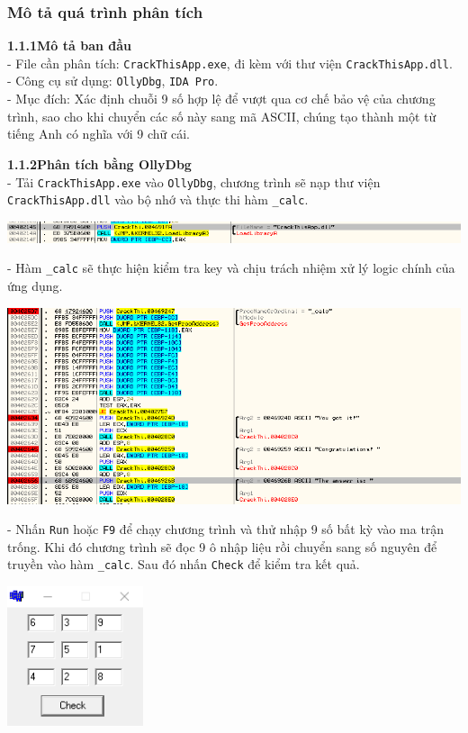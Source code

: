 
\subsubsection{Mô tả quá trình phân tích}
\noindent\textbf{1.1.1\quad Mô tả ban đầu}\\
- File cần phân tích: \texttt{CrackThisApp.exe}, đi kèm với thư viện \texttt{CrackThisApp.dll}.\\
- Công cụ sử dụng: \texttt{OllyDbg}, \texttt{IDA Pro}.\\
- Mục đích: Xác định chuỗi 9 số hợp lệ để vượt qua cơ chế bảo vệ của chương trình, sao cho khi chuyển các số này sang mã ASCII, chúng tạo thành một từ tiếng Anh có nghĩa với 9 chữ cái.

\noindent\textbf{1.1.2\quad Phân tích bằng OllyDbg}\\
- Tải \texttt{CrackThisApp.exe} vào \texttt{OllyDbg}, chương trình sẽ nạp thư viện \texttt{CrackThisApp.dll} vào bộ nhớ và thực thi hàm \texttt{\_calc}.
\begin{center}
	\includegraphics[width=1.0\textwidth]{img/file-1/image1.png}
\end{center}
- Hàm \texttt{\_calc} sẽ thực hiện kiểm tra key và chịu trách nhiệm xử lý logic chính của ứng dụng.
\begin{center}
	\includegraphics[width=1.0\textwidth]{img/file-1/image2.png}
\end{center}
- Nhấn \texttt{Run} hoặc \texttt{F9} để chạy chương trình và thử nhập 9 số bất kỳ vào ma trận trống. Khi đó chương trình sẽ đọc 9 ô nhập liệu rồi chuyển sang số nguyên để truyền vào hàm \texttt{\_calc}. Sau đó nhấn \texttt{Check} để kiểm tra kết quả. 
\begin{center}
	\includegraphics[width=0.3\textwidth]{img/file-1/image3.png}
\end{center}
